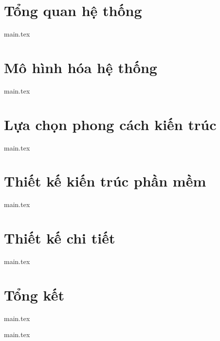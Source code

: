 \documentclass[12pt, a4paper]{report}
\theoremstyle{definition}
\begin{document}

\clearpage

\thispagestyle{empty}


\setcounter{page}{1}

\chapter{Tổng quan hệ thống}
\label{chap:overall}
\thispagestyle{fancy}
{main.tex}
\chapter{Mô hình hóa hệ thống}\label{chap:arch-choice} 
\thispagestyle{fancy}
{main.tex}

\chapter{Lựa chọn phong cách kiến trúc}\label{chap:arch-choice}
\thispagestyle{fancy}
{main.tex}



\chapter{Thiết kế kiến trúc phần mềm}
\label{chap:arch-design}
\thispagestyle{fancy}
{main.tex}



\chapter{Thiết kế chi tiết}
\label{chap:detailed-design}
\thispagestyle{fancy}
{main.tex}



\chapter{Tổng kết}
\label{chap:summary}
\thispagestyle{fancy}
{main.tex}



\newpage
\appendix
{main.tex}


\newpage


\end{document}
